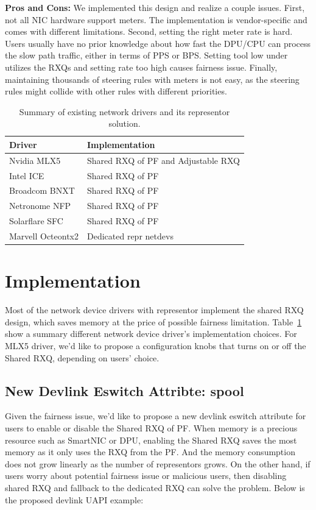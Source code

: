 \documentclass[letterpaper]{article}
\begin{document}
\textbf{Pros and Cons:} We implemented this design and realize a couple issues.
First, not all NIC hardware support meters. The implementation is vendor-specific
and comes with different limitations. Second, setting the right meter rate is hard.
Users usually have no prior knowledge
about how fast the DPU/CPU can process the slow path traffic, either in terms of
PPS or BPS. Setting tool low under utilizes the RXQs and setting rate too high
causes fairness issue.
Finally, maintaining thousands of steering rules with meters is not easy, as the
steering rules might collide with other rules with different priorities.

\begin{table}[h!]
\centering
\footnotesize
\begin{tabular}{|l|p{3.6cm}|} \hline
\textbf{Driver} &  \textbf{Implementation}\\ \hline \hline
Nvidia MLX5 & Shared RXQ of PF and \newline Adjustable RXQ \\ \hline
Intel ICE & Shared RXQ of PF~\cite{icepatch} \\ \hline
Broadcom BNXT & Shared RXQ of PF ~\cite{survey} \\ \hline
Netronome NFP & Shared RXQ of PF~\cite{survey} \\ \hline
Solarflare SFC & Shared RXQ of PF~\cite{survey} \\ \hline
Marvell Octeontx2 & Dedicated repr netdevs~\cite{octeontx2} \\ \hline
\end{tabular}
\caption{Summary of existing network drivers and its representor solution.}
\label{tab:vendors}
\end{table}

\section{Implementation}
Most of the network device drivers with representor implement the shared
RXQ design, which saves memory at the price of possible
fairness limitation. Table~\ref{tab:vendors} show a summary different
network device driver's implementation choices.
For MLX5 driver, we'd like to propose a configuration knobs that turns
on or off the Shared RXQ, depending on users' choice.

\subsection{New Devlink Eswitch Attribte: spool}
Given the fairness issue, we'd like to propose a new devlink eswitch attribute
for users to enable or disable the Shared RXQ of PF.
When memory is a precious resource such as SmartNIC or DPU, enabling the Shared RXQ
saves the most memory as it only uses the RXQ from the PF. And the memory consumption
does not grow linearly as the number of representors grows.
On the other hand, if users worry about potential fairness issue or malicious users,
then disabling shared RXQ and fallback to the dedicated RXQ can solve the problem.
Below is the proposed devlink UAPI example:
\end{document}
